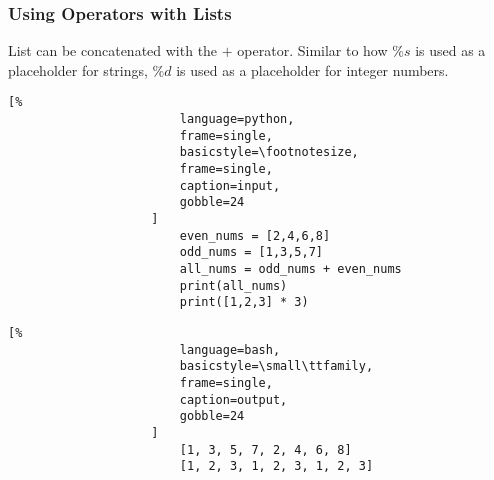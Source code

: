 \documentclass[crop=false,class=book]{standalone}
\begin{document}
            \subsubsection{Using Operators with Lists}
                List can be concatenated with the $+$ operator.
                Similar to how $\%s$ is used as a placeholder for
                strings, $\%d$ is used as a placeholder for integer
                numbers.\newline
                \begin{minipage}[t]{.48\textwidth}
                    \centering
                    \begin{lstlisting}[%
                        language=python,
                        frame=single,
                        basicstyle=\footnotesize,
                        frame=single,
                        caption=input,
                        gobble=24
                    ]
                        even_nums = [2,4,6,8]
                        odd_nums = [1,3,5,7]
                        all_nums = odd_nums + even_nums
                        print(all_nums)
                        print([1,2,3] * 3)
                    \end{lstlisting}
                \end{minipage}\hfill
                \begin{minipage}[t]{.48\textwidth}
                    \centering
                    \begin{lstlisting}[%
                        language=bash,
                        basicstyle=\small\ttfamily,
                        frame=single,
                        caption=output,
                        gobble=24
                    ]
                        [1, 3, 5, 7, 2, 4, 6, 8]
                        [1, 2, 3, 1, 2, 3, 1, 2, 3]
                    \end{lstlisting}
                \end{minipage}
\end{document}
